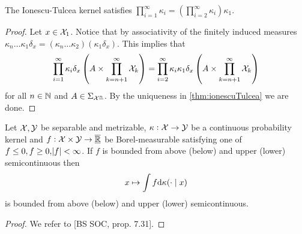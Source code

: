 \begin{lem}
  The Ionescu-Tulcea kernel satisfies
  $\prod_{i=1}^\infty \kappa_i = (\prod_{i=2}^\infty \kappa_i) \kappa_1 $.
  \label{lem:ionescu}
\end{lem}
\begin{proof}
  Let $x \in \mathcal{X}_1$.
  Notice that by associativity of the finitely induced measures
  $\kappa_n \dots \kappa_1 \delta_x
  = (\kappa_n \dots \kappa_2) (\kappa_1 \delta_x)$.
  This implies that
  \[ \prod_{i=1}^\infty \kappa_i \delta_x
    \left( A \times \prod_{k=n+1}^\infty \mathcal{X}_k \right)
    = \prod_{i=2}^\infty \kappa_i \kappa_1 \delta_x
  \left( A \times \prod_{k=n+1}^\infty \mathcal{X}_k \right) \]
  for all $n \in \mathbb{N}$ and $A \in \Sigma_{\mathcal{X}^{\underline{n}}}$.
  By the uniqueness in \cref{thm:ionescuTulcea} we are done.
\end{proof}


\begin{prop}
  Let $\mathcal{X}, \mathcal{Y}$ be separable and metrizable,
  $\kappa : \mathcal{X} \to \mathcal{Y}$ be a continuous probability kernel
  and $f:\mathcal{X} \times \mathcal{Y} \to \underline{\overline{\mathbb{R}}}$ be Borel-measurable
  satisfying one of
  $f \leq 0, f \geq 0, \abs{f} < \infty$.
  If $f$ is bounded from above (below) and upper (lower) semicontinuous
  then
  \[ x \mapsto \int f \mathrm{d} \kappa(\cdot \mid x) \]
  is bounded from above (below) and upper (lower) semicontinuous. 
  \label{prop:BS7_31}
\end{prop}

\begin{proof}
  We refer to [BS SOC, prop. 7.31]. %
\end{proof}

